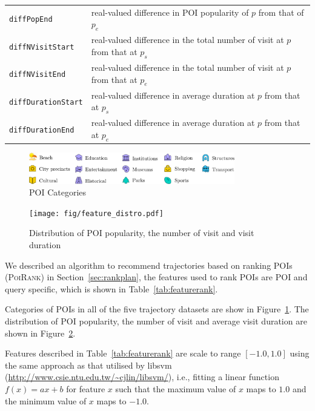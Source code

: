\begin{table}[t]
\begin{tabular}{l|l}
\texttt{diffPopEnd}             & real-valued difference in POI popularity of $p$ from that of $p_e$ \\
\texttt{diffNVisitStart}        & real-valued difference in the total number of visit at $p$ from that at $p_s$ \\
\texttt{diffNVisitEnd}          & real-valued difference in the total number of visit at $p$ from that at $p_e$ \\
\texttt{diffDurationStart}      & real-valued difference in average duration at $p$ from that at $p_s$ \\
\texttt{diffDurationEnd}        & real-valued difference in average duration at $p$ from that at $p_e$ \\ \hline
\end{tabular}
\end{table}


\begin{figure}[t]
	\centering
	\includegraphics[width=0.8\textwidth]{fig/poi_cats_fat.pdf}
	\caption{POI Categories}
	\label{fig:poicats}
\end{figure}


\begin{figure}[t]
\texttt{[image: fig/feature\_distro.pdf]}
\caption{Distribution of POI popularity, the number of visit and visit duration}
\label{fig:distro}\captionmoveup
\end{figure}



We described an algorithm to recommend trajectories based on ranking POIs (\textsc{PoiRank}) in Section~\ref{sec:rankplan},
the features used to rank POIs are POI and query specific, which is shown in Table~\ref{tab:featurerank}.

Categories of POIs in all of the five trajectory datasets are show in Figure~\ref{fig:poicats}.
The distribution of POI popularity, the number of visit and average visit duration are shown in Figure~\ref{fig:distro}.

Features described in Table~\ref{tab:featurerank} are scale to range $[-1.0, 1.0]$ using the same approach 
as that utilised by libsvm (\url{http://www.csie.ntu.edu.tw/~cjlin/libsvm/}),
i.e., fitting a linear function $f(x) = a x + b$ for feature $x$ such that the maximum value of $x$ maps to $1.0$ 
and the minimum value of $x$ maps to $-1.0$.



